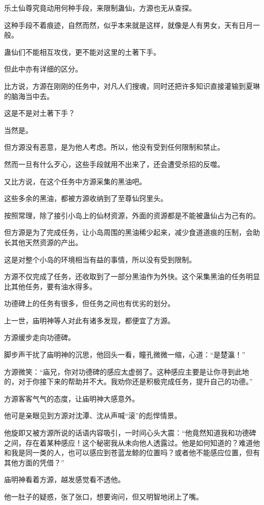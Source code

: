 \begin{this_body}
乐土仙尊究竟动用何种手段，来限制蛊仙，方源也无从查探。

这种手段不着痕迹，自然而然，似乎本来就是这样，就像是人有男女，天有日月一般。

蛊仙们不能相互攻伐，更不能对这里的土著下手。

但此中亦有详细的区分。

比方说，方源在刚刚的任务中，对凡人们搜魂，同时还把许多知识直接灌输到夏琳的脑海当中去。

这是不是对土著下手？

当然是。

但方源没有恶意，是为他人考虑。所以，他没有受到任何限制和禁止。

然而一旦有什么歹心，这些手段就用不出来了，还会遭受杀招的反噬。

又比方说，在这个任务中方源采集的黑油吧。

这些多余的黑油，都被方源收纳到了至尊仙窍里头。

按照常理，除了接引小岛上的仙材资源，外面的资源都是不能被蛊仙占为己有的。

但方源是为了完成任务，让小岛周围的黑油稀少起来，减少食道道痕的压制，会助长其他天然资源的产出。

这是对整个小岛的环境相当有益的事情，所以没有受到限制。

方源不仅完成了任务，还收取到了一部分黑油作为外快。这个采集黑油的任务明显比其他任务，要有油水得多。

功德碑上的任务有很多，但任务之间也有优劣的划分。

上一世，庙明神等人对此有诸多发现，都便宜了方源。

方源缓步走向功德碑。

脚步声干扰了庙明神的沉思，他回头一看，瞳孔微微一缩，心道：“是楚瀛！”

方源微笑：“庙兄，你对功德碑的感应太虚弱了。这种感应主要是让你寻到此地的，对于你接下来的帮助并不大。我劝你还是积极完成任务，提升自己的功德。”

方源客客气气的态度，让庙明神大感意外。

他可是亲眼见到方源对沈潭、沈从声喊“滚”的彪悍情景。

他旋即又被方源所说的话语内容吸引，一时间心头大震：“他竟然知道我和功德碑之间，存在着某种感应！这个秘密我从未向他人透露过。他是如何知道的？难道他和我是同一类的人，也可以感应到苍蓝龙鲸的位置吗？或者他不能感应位置，但有其他方面的凭借？”

庙明神看着方源，越发感觉看不透他。

他一肚子的疑惑，张了张口，想要询问，但又明智地闭上了嘴。


\end{this_body}
